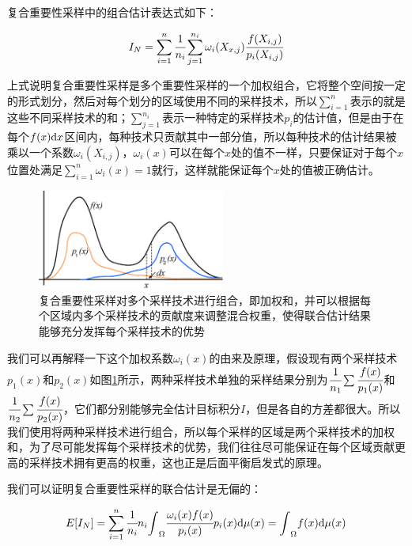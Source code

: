 复合重要性采样中的组合估计表达式如下：

\begin{equation}\label{e:combined-estimator}
	I_N=\sum_{i=1}^{n} \cfrac{1}{n_i}\sum_{j=1}^{n_i}\omega_i(X_{x,j}) \cfrac{f(X_{i,j})}{p_i(X_{i,j})}
\end{equation}

上式说明复合重要性采样是多个重要性采样的一个加权组合，它将整个空间按一定的形式划分，然后对每个划分的区域使用不同的采样技术，所以$\sum^{n}_{i=1}$表示的就是这些不同采样技术的和；$\sum^{n_i}_{j=1}$表示一种特定的采样技术$p_i$的估计值，但是由于在每个$f(x){\rm d}x$区间内，每种技术只贡献其中一部分值，所以每种技术的估计结果被乘以一个系数$\omega_i(X_{i,j})$，$\omega_i(x)$可以在每个$x$处的值不一样，只要保证对于每个$x$位置处满足$\sum^{n}_{i=1}\omega_i(x)=1$就行，这样就能保证每个$x$处的值被正确估计。

\begin{figure}
	\sidecaption
	\includegraphics[width=0.55\textwidth]{figures/mc/mis}
	\caption{复合重要性采样对多个采样技术进行组合，即加权和，并可以根据每个区域内多个采样技术的贡献度来调整混合权重，使得联合估计结果能够充分发挥每个采样技术的优势}
	\label{f:mc-mis-example}
\end{figure}

我们可以再解释一下这个加权系数$\omega_i(x)$的由来及原理，假设现有两个采样技术$p_1(x)$和$p_2(x)$如图\ref{f:mc-mis-example}所示，两种采样技术单独的采样结果分别为$ \cfrac{1}{n_1}\sum \cfrac{f(x)}{p_1(x)}$和$ \cfrac{1}{n_2}\sum \cfrac{f(x)}{p_2(x)}$，它们都分别能够完全估计目标积分$I$，但是各自的方差都很大。所以我们使用将两种采样技术进行组合，所以每个采样的区域是两个采样技术的加权和，为了尽可能发挥每个采样技术的优势，我们往往尽可能保证在每个区域贡献更高的采样技术拥有更高的权重，这也正是后面平衡启发式的原理。

我们可以证明复合重要性采样的联合估计是无偏的：

\begin{equation}
	E[I_N]=\sum_{i=1}^{n} \cfrac{1}{n_i}n_i{\rm \int}_{\Omega} \cfrac{\omega_i(x)f(x)}{p_i(x)}p_i(x){\rm d}\mu (x)={\rm \int}_{\Omega}f(x){\rm d}\mu (x)
\end{equation}

